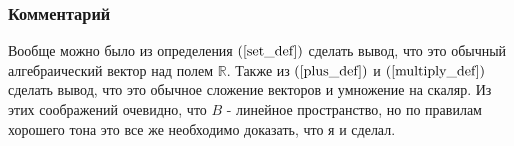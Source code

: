\subsubsection*{Комментарий}

Вообще можно было из определения $(\ref{set_def})$ сделать вывод, что это обычный алгебраический вектор над полем $\mathbb{R}$. Также из $(\ref{plus_def})$ и $(\ref{multiply_def})$ сделать вывод, что это обычное сложение векторов и умножение на скаляр. Из этих соображений очевидно, что $B$ - линейное пространство, но по правилам хорошего тона это все же необходимо доказать, что я и сделал.